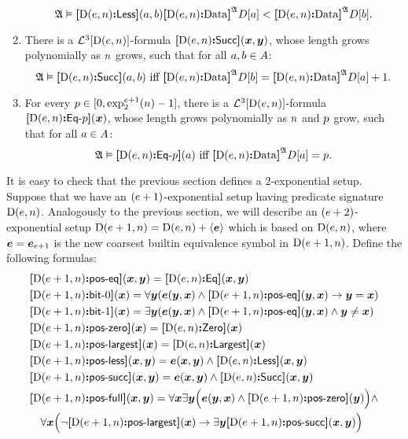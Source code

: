 \begin{definition}
\begin{enumerate}
\[{      \StrA \vDash \fLess{\DS(\sze,\nn)}(\ea,\eb)}{
      \Data{\DS(\sze,\nn)}\StrA\relD[\ea] <
      \Data{\DS(\sze,\nn)}\StrA\relD[\eb]}.
  \]
  \item There is a $\vFoF3{\DS(\sze,\nn)}$-formula
  $\fSucc{\DS(\sze,\nn)}(\xx,\yy)$, whose length grows polynomially as $\nn$
  grows, such that for all $\ea, \eb \in \domA$:
  \[
    \miff{
      \StrA \vDash \fSucc{\DS(\sze,\nn)}(\ea,\eb)}{
      \Data{\DS(\sze,\nn)}\StrA\relD[\eb] = \Data{\DS(\sze,\nn)}\StrA\relD[\ea]
      + 1}.
  \]
  \item For every $\posp \in [0, \tetr{\sze+1}2\nn - 1]$, there is a
  $\vFoF3{\DS(\sze,\nn)}$-formula $\fDataA{\DS(\sze,\nn)}\posp(\xx)$, whose
  length grows polynomially as $\nn$ and $\posp$ grow, such that for all
  $\ea \in  \domA$:
  \[
    \miff{
      \StrA \vDash \fDataA{\DS(\sze,\nn)}\posp(\ea)}{
      \Data{\DS(\sze,\nn)}\StrA\relD[\ea] = \posp}.
  \]
\end{enumerate}
\end{definition}
It is easy to check that the previous section defines a $2$-exponential setup.
Suppose that we have an $(\sze+1)$-exponential setup having predicate signature
$\DS(\sze,\nn)$. Analogously to the previous section, we will describe an
$(\sze+2)$-exponential setup $\DS(\sze+1,\nn) = \DS(\sze,\nn) + \seq{\se}$ which
is based on $\DS(\sze,\nn)$, where $\se = \see{\sze+1}$ is the new coarsest
builtin equivalence symbol in $\DS(\sze+1,\nn)$. Define the following formulas:
\begin{equation*}
\begin{aligned}
  &\fposeq{\DS(\sze+1,\nn)}(\xx,\yy) = \fEq{\DS(\sze,\nn)}(\xx,\yy) \\
  &\fbitO{\DS(\sze+1,\nn)}(\xx) = \forall\yy(\se(\yy,\xx) \land 
    \fposeq{\DS(\sze+1,\nn)}(\yy,\xx) \limp \yy = \xx) \\
  &\fbitI{\DS(\sze+1,\nn)}(\xx) = \exists\yy(\se(\yy,\xx) \land
    \fposeq{\DS(\sze+1,\nn)}(\yy,\xx) \land \yy \neq \xx) \\
  &\fposzero{\DS(\sze+1,\nn)}(\xx) = \fZero{\DS(\sze,\nn)}(\xx) \\
  &\fposmax{\DS(\sze+1,\nn)}(\xx) = \fMax{\DS(\sze,\nn)}(\xx) \\
  &\fposless{\DS(\sze+1,\nn)}(\xx,\yy) = \se(\xx,\yy) \land
    \fLess{\DS(\sze,\nn)}(\xx,\yy) \\
  &\fpossucc{\DS(\sze+1,\nn)}(\xx,\yy) = \se(\xx,\yy) \land
    \fSucc{\DS(\sze,\nn)}(\xx,\yy) \\
  &\fposfull{\DS(\sze+1,\nn)}(\xx,\yy) = \forall\xx\exists\yy\Big(\se(\yy,\xx) \land \fposzero{\DS(\sze+1,\nn)}(\yy)\Big) \land \\
    &\quad\forall\xx\Big(\lnot\fposmax{\DS(\sze+1,\nn)}(\xx) \limp
    \exists\yy\fpossucc{\DS(\sze+1,\nn)}(\xx,\yy)\Big) \\
\end{aligned}
\end{equation*}
